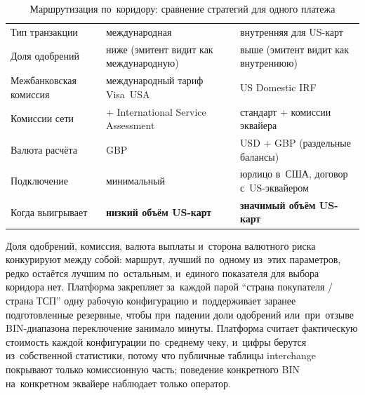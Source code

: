 \begin{table}[tbp]
  \caption{Маршрутизация по~коридору: сравнение стратегий
  для одного платежа}\label{tab:corridor-routing}
  \begingroup
  \tablesetup
  \begin{minipage}{\textwidth}
    \begin{tabularx}{\textwidth}{@{}B{0.22\textwidth} Y Y@{}}
      \toprule
      \headrow
       &  &
       \\
      \midrule
      Тип транзакции & международная & внутренняя для US-карт \\
      \rowsep
      Доля одобрений & ниже (эмитент видит как международную) &
      выше (эмитент видит как внутреннюю) \\
      \rowsep
      Межбанковская комиссия & международный тариф Visa~USA & US Domestic IRF \\
      \rowsep
      Комиссии сети & + International Service Assessment &
      стандарт + комиссии эквайера \\
      \rowsep
      Валюта расчёта & GBP & USD + GBP (раздельные балансы) \\
      \rowsep
      Подключение & минимальный & юрлицо в~США, договор с~US-эквайером \\
      \rowsep
      Когда выигрывает & \textbf{низкий объём US-карт} & \textbf{значимый объём US-карт} \\
      \bottomrule
    \end{tabularx}
    \par\smallskip
  \end{minipage}\par
  \endgroup
\end{table}


Доля одобрений, комиссия, валюта выплаты и~сторона валютного риска конкурируют
между собой: маршрут, лучший по~одному из~этих параметров, редко остаётся лучшим
по~остальным, и~единого показателя для выбора коридора нет. Платформа
закрепляет за~каждой парой \enquote{страна покупателя / страна ТСП} одну
рабочую конфигурацию и~поддерживает заранее подготовленные резервные,
чтобы при~падении доли одобрений или~при~отзыве BIN-диапазона переключение
занимало минуты. Платформа считает фактическую стоимость
каждой конфигурации по~среднему чеку, и~цифры берутся из~собственной
статистики, потому что публичные таблицы interchange покрывают только
комиссионную часть; поведение конкретного BIN на~конкретном эквайере наблюдает
только оператор.

